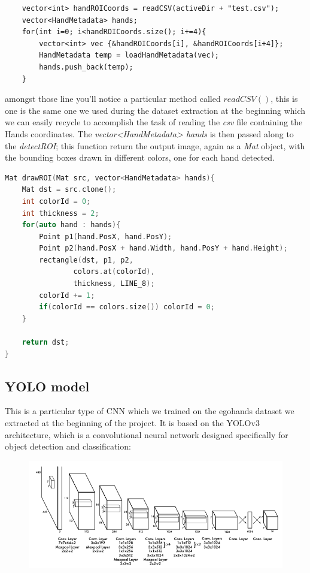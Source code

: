 \begin{lstlisting}
    vector<int> handROICoords = readCSV(activeDir + "test.csv");
    vector<HandMetadata> hands;
    for(int i=0; i<handROICoords.size(); i+=4){
        vector<int> vec {&handROICoords[i], &handROICoords[i+4]};
        HandMetadata temp = loadHandMetadata(vec);
        hands.push_back(temp);
    }
\end{lstlisting}

amongst those line you'll notice a particular method called $readCSV()$, this is one is the same one we used during the dataset extraction at the beginning 
which we can easily recycle to accomplish the task of reading the \textit{csv} file containing the Hands coordinates. The \textit{vector<HandMetadata> hands} 
is then passed along to the \textit{detectROI}; this function return the output image, again as a \textit{Mat} object, with the bounding boxes drawn in different colors, one for each hand detected.

\begin{lstlisting}[language = c++]
    Mat drawROI(Mat src, vector<HandMetadata> hands){
    Mat dst = src.clone();
    int colorId = 0;
    int thickness = 2;
    for(auto hand : hands){
        Point p1(hand.PosX, hand.PosY);
        Point p2(hand.PosX + hand.Width, hand.PosY + hand.Height);
        rectangle(dst, p1, p2,
                colors.at(colorId),
                thickness, LINE_8);
        colorId += 1;
        if(colorId == colors.size()) colorId = 0;
    }
    
    return dst;
}

\end{lstlisting}

\subsection{YOLO model}
This is a particular type of CNN which we trained on the egohands dataset we extracted at the beginning of the project. It is based on the YOLOv3 architecture, which is a convolutional neural network designed specifically
for object detection and classification:

\begin{figure}[!h]
    \centering
    \includegraphics[scale = 0.5]{images/yolo1_net.png}
\end{figure}

